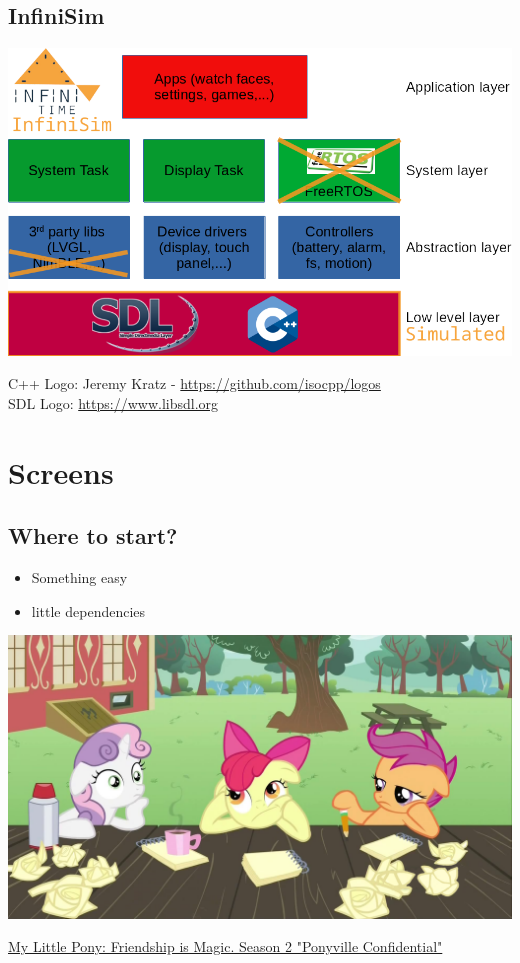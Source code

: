 \documentclass{beamer}
\begin{document}
\subsection{InfiniSim}
\begin{frame}{}
  \includegraphics[width=\textwidth]{../architecture_infinisim}

  \small C++ Logo: Jeremy Kratz -
    \href{https://github.com/isocpp/logos}{https://github.com/isocpp/logos}\\
  \small SDL Logo: \href{https://www.libsdl.org}{https://www.libsdl.org}
\end{frame}

\section{Screens}
\subsection{Where to start?}
\begin{frame}{}
  \begin{itemize}
    \item Something easy
    \item little dependencies
  \end{itemize}
  \includegraphics[width=\textwidth]{../ponies_thinking}

  \small \href{http://awthredestim.blogspot.com/2012/04/my-little.html}{My Little Pony: Friendship is Magic. Season 2 "Ponyville Confidential"}
\end{frame}
\end{document}
